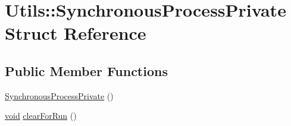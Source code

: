 \hypertarget{struct_utils_1_1_synchronous_process_private}{\section{\-Utils\-:\-:\-Synchronous\-Process\-Private \-Struct \-Reference}
\label{struct_utils_1_1_synchronous_process_private}
}
\subsection*{\-Public \-Member \-Functions}
\begin{DoxyCompactItemize}
\item 
\hyperlink{struct_utils_1_1_synchronous_process_private_a509d0e3bb1a797c969a42ae9cd4f1c83}{\-Synchronous\-Process\-Private} ()
\item 
\hyperlink{group___u_a_v_objects_plugin_ga444cf2ff3f0ecbe028adce838d373f5c}{void} \hyperlink{struct_utils_1_1_synchronous_process_private_a174a7b27f71f0f674c55c565c414b58a}{clear\-For\-Run} ()
\end{DoxyCompactItemize}

